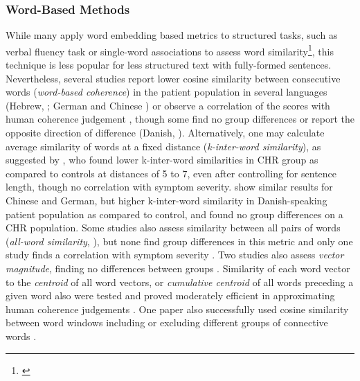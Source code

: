 \subsubsection{Word-Based Methods}

While many apply word embedding based metrics to structured tasks, such as verbal fluency task or single-word associations to assess word similarity\footnote{\citep{elvevaag2007quantifying, holmlund2019updating, pietrowicz2019new, ku2021computational}}, this technique is less popular for less structured text with fully-formed sentences. Nevertheless, several studies report lower cosine similarity between consecutive words (\textit{word-based coherence}) in the patient population in several languages (Hebrew, \cite{bar2019semantic}; German and Chinese \cite{parola2022speech}) or observe a correlation of the scores with human coherence judgement \citep{xu2020centroid}, though some find no group differences \citep{liebenthal2022linguistic, argolo2023burnishing} or report the opposite direction of difference (Danish, \cite{parola2022speech}). Alternatively, one may calculate average similarity of words at a fixed distance (\textit{k-inter-word similarity}), as suggested by \citet{corcoran2018prediction}, who found lower k-inter-word similarities in CHR group as compared to controls at distances of 5 to 7, even after controlling for sentence length, though no correlation with symptom severity. \citet{parola2022speech} show similar results for Chinese and German, but higher k-inter-word similarity in Danish-speaking patient population as compared to control, and \citet{argolo2023burnishing} found no group differences on a CHR population. Some studies also assess similarity between all pairs of words (\textit{all-word similarity}, \citet{alonso2022language, alonso2022progressive, liebenthal2022linguistic}), but none find group differences in this metric and only one study finds a correlation with symptom severity \citep{alonso2022progressive}. Two studies also assess \textit{vector magnitude}, finding no differences between groups \citep{rezaii2019machine, liebenthal2022linguistic}. Similarity of each word vector to the \textit{centroid} of all word vectors, or \textit{cumulative centroid} of all words preceding a given word also were tested and proved moderately efficient in approximating human coherence judgements \citep{xu2020centroid, xu2022fully}. One paper also successfully used cosine similarity between word windows including or excluding different groups of connective words \citep{corona2022assessing}.

